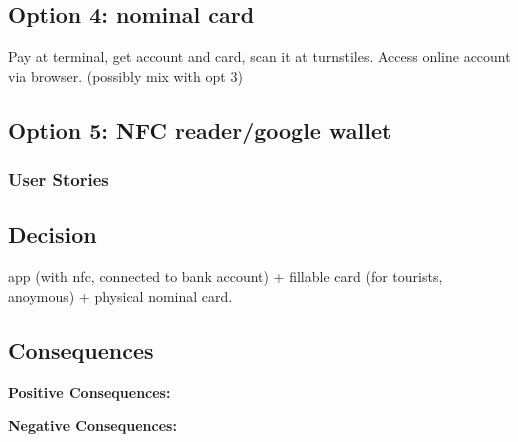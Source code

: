 \subsection*{Option 4: nominal card}
Pay at terminal, get account and card, scan it at turnstiles. Access online account via browser. (possibly mix with opt 3)

\subsection*{Option 5: NFC reader/google wallet}


\subsubsection*{User Stories}
\subsection*{Decision}
app (with nfc, connected to bank account) + fillable card (for tourists, anoymous) + physical nominal card.
\subsection*{Consequences}
\textbf{Positive Consequences:}
\begin{itemize}
\end{itemize}
\textbf{Negative Consequences:}
\begin{itemize}
\end{itemize}